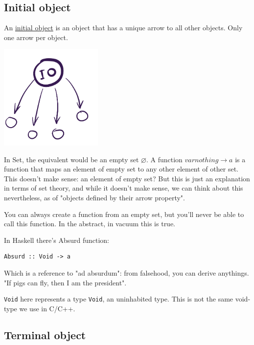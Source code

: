\documentclass[11pt]{article}
\begin{document}
\subsection{Initial object}
\label{sec:org802c37e}

An \href{https://en.wikipedia.org/wiki/Initial\_and\_terminal\_objects}{initial object} is an object that has a unique arrow to all other objects. Only one arrow per object.

\begin{center}
\includegraphics[width=2.0in]{./img/initial_object.png}
\end{center}

In Set, the equivalent would be an empty set \(\varnothing\). A function \(varnothing \rightarrow a\) is a function that maps an element of empty set to any other element of other set. This doesn't make sense: an element of empty set? But this is just an explanation in terms of set theory, and while it doesn't make sense, we can think about this nevertheless, as of "objects defined by their arrow property".

You can always create a function from an empty set, but you'll never be able to call this function. In the abstract, in vacuum this is true.

In Haskell there's Absurd function:

\begin{verbatim}
Absurd :: Void -> a
\end{verbatim}

Which is a reference to "ad absurdum": from falsehood, you can derive anythings. "If pigs can fly, then I am the president".

\texttt{Void} here represents a type \texttt{Void}, an uninhabited type. This is not the same void-type we use in C/C++.

\subsection{Terminal object}
\label{sec:org3c08bf8}
\end{document}
